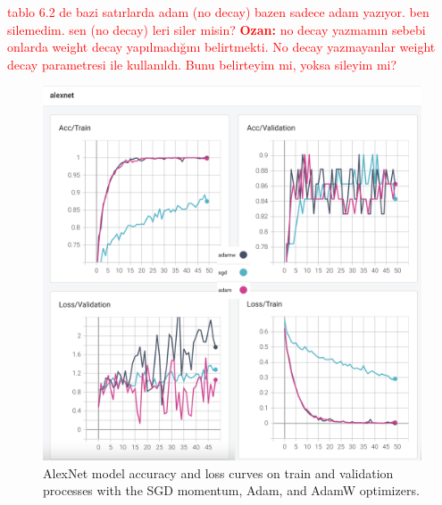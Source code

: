  \textcolor{red}{tablo 6.2 de bazi satırlarda adam (no decay) bazen sadece adam yazıyor. ben silemedim. sen (no decay) leri siler misin? \textbf{Ozan:} no decay yazmamın sebebi onlarda weight decay yapılmadığını belirtmekti. No decay yazmayanlar weight decay parametresi ile kullanıldı. Bunu belirteyim mi, yoksa sileyim mi?}


\begin{figure}[!h]
    \centering
    \includegraphics[width=\linewidth]{fig/alexnet.png}
    \vspace{2mm}
    \caption{AlexNet model accuracy and loss curves on train and validation processes with the SGD momentum, Adam, and AdamW optimizers.}
    \label{fig:alexnet_plots}
\end{figure}

